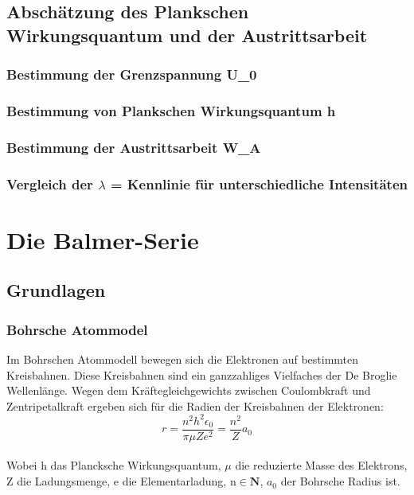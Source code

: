 \documentclass[ngerman]{scrartcl}
\begin{document}
\subsection{Abschätzung des Plankschen Wirkungsquantum und der Austrittsarbeit}
\subsubsection{Bestimmung der Grenzspannung U_0}
\subsubsection{Bestimmung von Plankschen Wirkungsquantum h}
\subsubsection{Bestimmung der Austrittsarbeit W_A}
\subsubsection{Vergleich der $\lambda$ = Kennlinie für unterschiedliche Intensitäten }
\clearpage
\section{Die Balmer-Serie}
\subsection{Grundlagen}
\subsubsection{Bohrsche Atommodel}
Im Bohrschen Atommodell bewegen sich die Elektronen auf bestimmten Kreisbahnen. Diese Kreisbahnen sind ein ganzzahliges Vielfaches der De Broglie Wellenlänge.
Wegen dem Kräftegleichgewichts zwischen Coulombkraft und Zentripetalkraft ergeben sich für die Radien der Kreisbahnen der Elektronen:
\begin{equation}
    r = \frac{n^2 h^2 \epsilon_0}{\pi \mu Z e^2} = \frac{n^2}{Z} a_0
\end{equation}\\
Wobei h das Plancksche Wirkungsquantum, $\mu$ die reduzierte Masse des Elektrons, Z die
Ladungsmenge, e die Elementarladung, n$\in \mathbf{N}$, $a_0$  der Bohrsche Radius ist.
\end{document}
